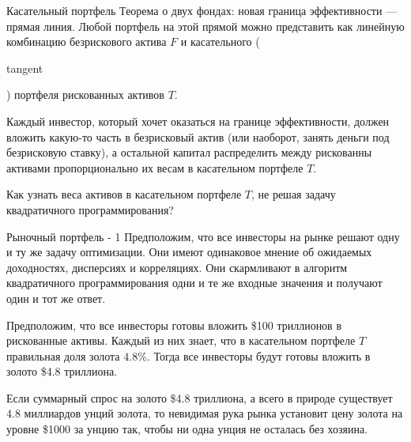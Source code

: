 \documentclass{beamer}
\newcommand{\en}[1]{\begin{otherlanguage}{english}#1\end{otherlanguage}}
\begin{document}
\begin{frame}{Касательный портфель}
\justify
Теорема о двух фондах: новая граница эффективности --- прямая линия. Любой 
портфель на этой прямой можно представить как линейную комбинацию безрискового 
актива $F$ и касательного (\en{tangent}) портфеля рискованных активов $T$.

\justify
Каждый инвестор, который хочет оказаться на границе эффективности, должен 
вложить какую-то часть в безрисковый актив (или наоборот, занять деньги под 
безрисковую ставку), а остальной капитал распределить между рискованны активами
пропорционально их весам в касательном портфеле $T$.

\justify
Как узнать веса активов в касательном портфеле $T$, не решая задачу 
квадратичного программирования?
\end{frame}



\begin{frame}{Рыночный портфель - 1}
\justify
Предположим, что все инвесторы на рынке решают одну и ту же задачу оптимизации.
Они имеют одинаковое мнение об ожидаемых доходностях, дисперсиях и корреляциях.
Они скармливают в алгоритм квадратичного программирования одни и те же входные 
значения и получают один и тот же ответ.

\justify
Предположим, что все инвесторы готовы вложить \$100 триллионов в рискованные 
активы. Каждый из них знает, что в касательном портфеле $T$ правильная доля 
золота $4.8\%$. Тогда все инвесторы будут готовы вложить в золото \$4.8 
триллиона.

\justify
Если суммарный спрос на золото \$4.8 триллиона, а всего в природе существует 
4.8 миллиардов унций золота, то невидимая рука рынка установит цену золота на 
уровне \$1000 за унцию так, чтобы ни одна унция не осталась без хозяина.
\end{frame}
\end{document}
